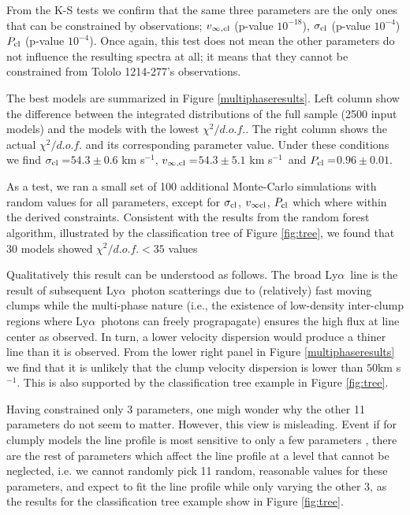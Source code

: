\documentclass[a4,useAMS,usenatbib,usegraphicx]{mn2e}
\newcommand{\tol}{Tololo 1214-277}
\newcommand{\lya}{Ly$\alpha$}
\newcommand{\kms}{km s$^{-1}$}
\newcommand{\sigmaclump}{$54.3\pm 0.6$ km s$^{-1}$}
\newcommand{\inftyclump}{$54.3\pm 5.1$ km s$^{-1}$}
\newcommand{\probaclump}{$0.96\pm 0.01$}
\begin{document}
From the K-S tests we confirm that the same three parameters are the
only ones that can be constrained by observations;
$v_{\infty,\rm{cl}}$ (p-value  $10^{-18}$), $\sigma_{\rm cl}$ (p-value
$10^{-4}$) $P_{\rm cl}$ (p-value $10^{-4}$).
Once again, this test does not mean the other parameters do not
influence the resulting spectra at all; it means that they cannot be
constrained from \tol's observations. 


The best models are summarized in Figure \ref{multiphaseresults}.
Left column show the difference between the integrated distributions
of the full sample (2500 input models) and the models with the lowest
$\chi^2/d.o.f.$. 
The right column shows the actual $\chi^2/d.o.f.$ 
and its corresponding parameter value. 
Under these conditions we find $\sigma_{\rm cl}=$\sigmaclump,
$v_{\infty {\rm, cl}}=$\inftyclump\ and $P_{\rm cl}=$\probaclump. 

As a test, we ran a small set of 100 additional Monte-Carlo simulations
with random values for all parameters, except for $\sigma_{\rm cl}$,
$v_{\infty {\rm cl}}$, $P_{\rm cl}$ which where within the derived
constraints.
Consistent with the results from the random forest algorithm,
illustrated by the classification tree of Figure \ref{fig:tree}, we
found that $30$ models showed $\chi^2/d.o.f.<35$ values  


Qualitatively this result can be understood as follows. 
The broad \lya\ line is the result of subsequent \lya\ photon
scatterings due to (relatively) fast moving clumps while the
multi-phase nature (i.e., the existence of low-density inter-clump
regions where \lya\ photons can freely prograpagate)  ensures the high
flux at line center as observed.   
In turn, a lower velocity dispersion would produce a thiner line than
it is observed.
From the lower right panel in Figure \ref{multiphaseresults} we find that it
is unlikely that the clump velocity dispersion is lower than
$50$\kms. 
This is also supported by the classification tree example in Figure
\ref{fig:tree}.  

Having constrained only 3 parameters, one migh wonder why the other 11
parameters do not seem to matter. 
However, this view is misleading. 
Event if for clumply models the line profile is most sensitive to only
a few parameters \citep{Gronke2016}, there are the rest of parameters
which affect the line profile at a level that cannot be neglected,
i.e. we cannot randomly pick 11 random, reasonable values for these
parameters, and expect to fit the line profile while only varying the
other 3, as the results for the classification tree example show in
Figure \ref{fig:tree}.
\end{document}
